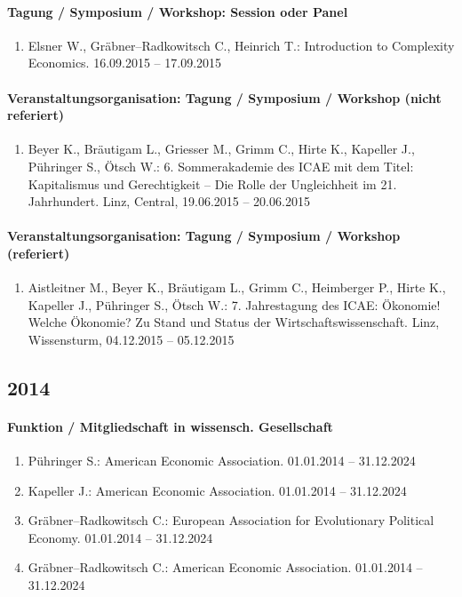 \paragraph{Tagung / Symposium / Workshop: Session oder Panel}
\begin{enumerate}[leftmargin=*, labelsep=0.5cm]
\item Elsner W., Gräbner--Radkowitsch C., Heinrich T.: Introduction to Complexity Economics. 16.09.2015 -- 17.09.2015
\end{enumerate}
\paragraph{Veranstaltungsorganisation: Tagung / Symposium / Workshop (nicht referiert)}
\begin{enumerate}[leftmargin=*, labelsep=0.5cm]
\item Beyer K., Bräutigam L., Griesser M., Grimm C., Hirte K., Kapeller J., Pühringer S., Ötsch W.: 6. Sommerakademie des ICAE mit dem Titel: Kapitalismus und Gerechtigkeit -- Die Rolle der Ungleichheit im 21. Jahrhundert. Linz, Central, 19.06.2015 -- 20.06.2015
\end{enumerate}
\paragraph{Veranstaltungsorganisation: Tagung / Symposium / Workshop (referiert)}
\begin{enumerate}[leftmargin=*, labelsep=0.5cm]
\item Aistleitner M., Beyer K., Bräutigam L., Grimm C., Heimberger P., Hirte K., Kapeller J., Pühringer S., Ötsch W.: 7. Jahrestagung des ICAE: Ökonomie! Welche Ökonomie? Zu Stand und Status der Wirtschaftswissenschaft. Linz, Wissensturm, 04.12.2015 -- 05.12.2015
\end{enumerate}\subsection*{2014}\paragraph{Funktion / Mitgliedschaft in wissensch. Gesellschaft}
\begin{enumerate}[leftmargin=*, labelsep=0.5cm]
\item Pühringer S.: American Economic Association. 01.01.2014 -- 31.12.2024
\item Kapeller J.: American Economic Association. 01.01.2014 -- 31.12.2024
\item Gräbner--Radkowitsch C.: European Association for Evolutionary Political Economy. 01.01.2014 -- 31.12.2024
\item Gräbner--Radkowitsch C.: American Economic Association. 01.01.2014 -- 31.12.2024
\end{enumerate}
